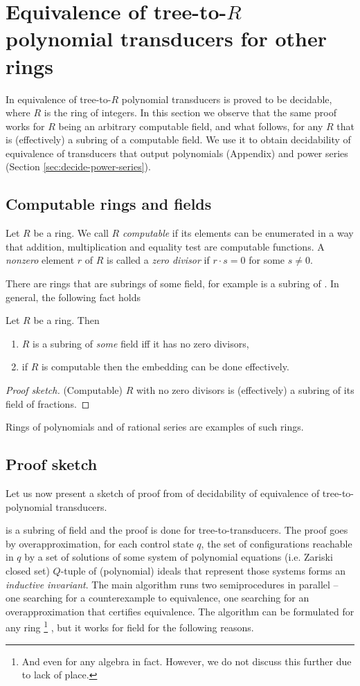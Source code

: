 \section{Equivalence of tree-to-$R$ polynomial transducers for other rings}
In \cite{seidlManethKemper2018} equivalence of tree-to-$R$ polynomial transducers is proved to be decidable, where $R$ is the ring of integers.
In this section we observe that the same proof works for $R$ being an arbitrary computable field, and what follows, for any $R$ that is (effectively) a subring of a computable field. We use it to obtain decidability of equivalence of transducers that output polynomials (Appendix) and power series (Section \ref{sec:decide-power-series}).
\subsection{Computable rings and fields}
Let $R$ be a ring. We call $R$ \emph{computable} if its elements can be enumerated in a way that addition, multiplication and equality test are computable functions. A \emph{nonzero} element $r$ of $R$ is called a \emph{zero divisor} if $r \cdot s = 0$ for some $s \neq 0$.

There are rings that are subrings of some field, for example 
\Z is a subring of \Q. In general, the following fact holds
\begin{lemma}
	Let $R$ be a ring. Then
\begin{enumerate}
		\item $R$ is a subring of \emph{some} field iff it has no zero divisors,
		\item if $R$ is computable then the embedding can be done effectively.
\end{enumerate}
\end{lemma}
\begin{proof}[Proof sketch]
(Computable) $R$ with no zero divisors is (effectively) a subring of its field of fractions.
\end{proof}

Rings of polynomials and of rational series are examples of such rings. 
\subsection{Proof sketch}
Let us now present a sketch of proof from \cite{seidlManethKemper2018} of decidability of equivalence of tree-to-\Z polynomial transducers.

\Z is a subring of field \Q and the proof is done for tree-to-\Q transducers.
The proof goes by overapproximation, for each control state $q$, the set of configurations reachable in $q$ by a set of solutions of some system of polynomial equations (i.e. Zariski closed set) $Q$-tuple of (polynomial) ideals that represent those systems forms an \emph{inductive invariant}.
The main algorithm runs two semiprocedures in parallel -- one searching for a counterexample to equivalence, one searching for an overapproximation that certifies equivalence. The algorithm can be formulated for any ring
\footnote{And even for any algebra in fact. However, we do not discuss this further due to lack of place.}
, but it works for field \Q for the following reasons.


